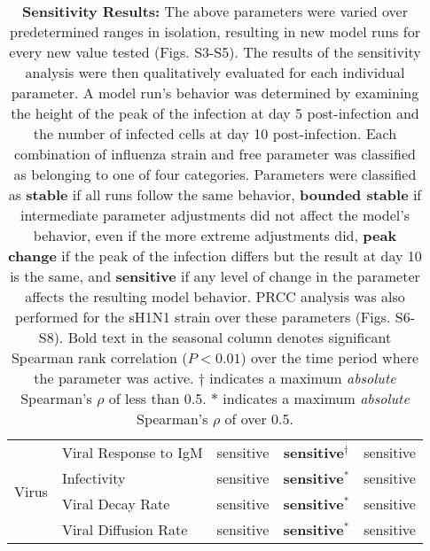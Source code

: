\documentclass[10pt]{article}
\newcommand{\new}[1]{{\color{dkgreen}#1}}
\newenvironment{response}{\fontfamily{cms}\selectfont\small}{\par}
\begin{document}
\begin{itemize}
\begin{response}
\begin{displayquote}
\begin{table}[!ht]
\begin{center}
\begin{tabular}{| c | l | c c c |}
  \hline 
  \multirow{4}{*}{Virus} & Viral Response to IgM & \cellcolor{red!40}sensitive & \cellcolor{red!40}\textbf{sensitive$^\dagger$} & \cellcolor{red!40}sensitive \\
  & Infectivity & \cellcolor{red!40}sensitive & \cellcolor{red!40}\textbf{sensitive$^*$} & \cellcolor{red!40}sensitive \\
  & Viral Decay Rate & \cellcolor{red!40}sensitive & \cellcolor{red!40}\textbf{sensitive$^*$} & \cellcolor{red!40}sensitive \\
  & Viral Diffusion Rate & \cellcolor{red!40}sensitive & \cellcolor{red!40}\textbf{sensitive$^*$} & \cellcolor{red!40}sensitive \\
  \hline  
\end{tabular}
\caption{\textbf{Sensitivity Results:} The above parameters were varied over predetermined ranges in isolation, resulting in new model runs for every new value tested (Figs. S3-S5).  The results of the sensitivity analysis were then qualitatively evaluated for each individual parameter.  A model run's behavior was determined by examining the height of the peak of the infection at day 5 post-infection and the number of infected cells at day 10 post-infection.  Each combination of influenza strain and free parameter was classified as belonging to one of four categories.  Parameters were classified as \textbf{stable} if all runs follow the same behavior, \textbf{bounded stable} if intermediate parameter adjustments did not affect the model's behavior, even if the more extreme adjustments did, \textbf{peak change} if the peak of the infection differs but the result at day 10 is the same, and \textbf{sensitive} if any level of change in the parameter affects the resulting model behavior.  \new{PRCC analysis was also performed for the sH1N1 strain over these parameters (Figs. S6-S8).  Bold text in the seasonal column denotes significant Spearman rank correlation ($P < 0.01$) over the time period where the parameter was active. $\dagger$ indicates a maximum \textit{absolute} Spearman's $\rho$ of less than 0.5.  $*$ indicates a maximum \textit{absolute} Spearman's $\rho$ of over 0.5.}}
\label{tab:sensitivity}
\end{center}
\end{table}

\end{displayquote}
\end{response}

\end{itemize}
\end{document}
